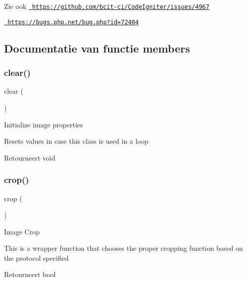 \begin{DoxySeeAlso}{Zie ook}
\href{https://github.com/bcit-ci/CodeIgniter/issues/4967}{\texttt{ https\+://github.\+com/bcit-\/ci/\+Code\+Igniter/issues/4967}} 

\href{https://bugs.php.net/bug.php?id=72404}{\texttt{ https\+://bugs.\+php.\+net/bug.\+php?id=72404}}
\end{DoxySeeAlso}


\subsection{Documentatie van functie members}
\mbox{\label{class_c_i___image__lib_aa821bec12eaa7e0f649397c9675ff505}} 
\subsubsection{\texorpdfstring{clear()}{clear()}}
{\footnotesize\ttfamily clear (\begin{DoxyParamCaption}{ }\end{DoxyParamCaption})}

Initialize image properties

Resets values in case this class is used in a loop

\begin{DoxyReturn}{Retourneert}
void 
\end{DoxyReturn}
\mbox{\label{class_c_i___image__lib_a77248c0134d1b117eb36774ecee6e04c}} 
\subsubsection{\texorpdfstring{crop()}{crop()}}
{\footnotesize\ttfamily crop (\begin{DoxyParamCaption}{ }\end{DoxyParamCaption})}

Image Crop

This is a wrapper function that chooses the proper cropping function based on the protocol specified

\begin{DoxyReturn}{Retourneert}
bool 
\end{DoxyReturn}
\mbox{\label{class_c_i___image__lib_a71a6f2e6d97ff5347257f101002bc903}} 

